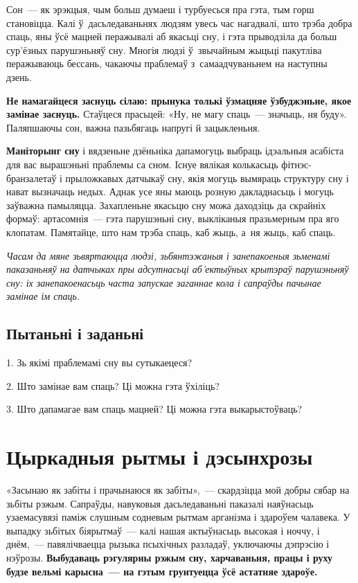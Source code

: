 Сон~--- як эрэкцыя, чым больш думаеш і турбуесься пра гэта, тым горш становіцца. Калі ў~дасьледаваньнях людзям увесь час нагадвалі, што трэба добра спаць, яны ўсё мацней перажывалі аб якасьці сну, і гэта прыводзіла да больш сур'ёзных парушэньняў сну. Многія людзі ў~звычайным жыцьці пакутліва перажываюць бессань, чакаючы праблемаў з~самаадчуваньнем на наступны дзень.

\textbf{Не намагайцеся заснуць сілаю: прынука толькі ўзмацняе ўзбуджэньне, якое замінае заснуць.} Стаўцеся прасьцей: «Ну, не магу спаць~--- значыць, ня буду». Паляпшаючы сон, важна пазьбягаць напругі й зацыкленьня.

\textbf{Маніторынг сну} і вядзеньне дзёньніка дапамогуць выбраць ідэальныя асабіста для вас вырашэньні праблемы са сном. Існуе вялікая колькасьць фітнэс-бранзалетаў і прыложкавых датчыкаў сну, якія могуць вымяраць структуру сну і нават вызначаць недых. Аднак усе яны маюць розную дакладнасьць і могуць заўважна памыляцца. Захапленьне якасьцю сну можа даходзіць да скрайніх формаў: артасомнія~--- гэта парушэньні сну, выкліканыя празьмерным пра яго клопатам. Памятайце, што нам трэба спаць, каб жыць, а~ня жыць, каб спаць.

\emph{Часам да мяне зьвяртаюцца людзі, зьбянтэжаныя і занепакоеныя зьменамі паказаньняў на датчыках пры адсутнасьці аб'ектыўных крытэраў парушэньняў сну: іх занепакоенасьць часта запускае заганнае кола і сапраўды пачынае замінае ім спаць.}

\subsection*{Пытаньні і заданьні}

1. Зь якімі праблемамі сну вы сутыкаецеся?

2. Што замінае вам спаць? Ці можна гэта ўхіліць?

3. Што дапамагае вам спаць мацней? Ці можна гэта выкарыстоўваць?


\section{Цыркадныя рытмы і дэсынхрозы}

«Засынаю як забіты і прачынаюся як забіты»,~--- скардзіцца мой добры сябар на зьбіты рэжым. Сапраўды, навуковыя дасьледаваньні паказалі наяўнасьць узаемасувязі паміж слушным содневым рытмам арганізма і здароўем чалавека. У выпадку зьбітых біярытмаў~--- калі нашая актыўнасьць высокая і ноччу, і днём,~--- павялічваецца рызыка псыхічных разладаў, уключаючы дэпрэсію і нэўрозы. \textbf{Выбудаваць рэгулярны рэжым сну, харчаваньня, працы і руху будзе вельмі карысна~--- на гэтым грунтуецца ўсё астатняе здароўе.}

